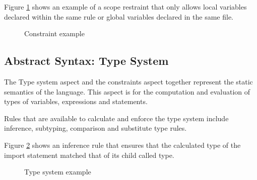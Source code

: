Figure \ref{fig:constraint_example} shows an example of a scope restraint that only allows local variables declared within the same rule or global variables declared in the same file.
 
\begin{figure}
    \centering
    \caption{Constraint example}
    \label{fig:constraint_example}
\end{figure}

\subsection{Abstract Syntax: Type System}
The Type system aspect and the constraints aspect together represent the static semantics of the language.
This aspect is for the computation and evaluation of types of variables, expressions and statements.

Rules that are available to calculate and enforce the type system include inference, subtyping, comparison and substitute type rules.

Figure \ref{fig:typesystem_example} shows an inference rule that ensures that the calculated type of the import statement matched that of its child called type.

\begin{figure}
    \centering
    \caption{Type system example}
    \label{fig:typesystem_example}
\end{figure}

